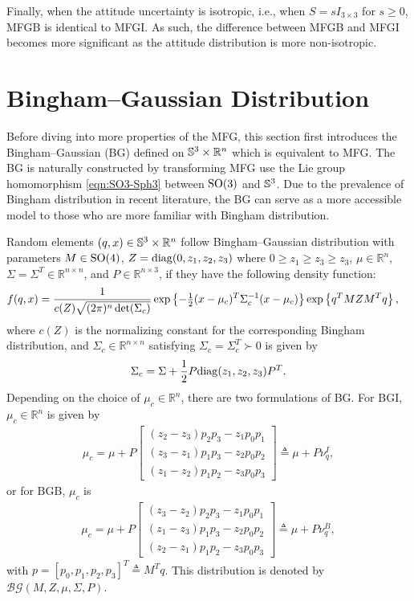 Finally, when the attitude uncertainty is isotropic, i.e., when $S=sI_{3\times 3}$ for $s \geq 0$, MFGB is identical to MFGI.
As such, the difference between MFGB and MFGI becomes more significant as the attitude distribution is more non-isotropic.

\section{Bingham--Gaussian Distribution}

Before diving into more properties of the MFG, this section first introduces the Bingham--Gaussian (BG) defined on $\mathbb{S}^3\times \mathbb{R}^n$ which is equivalent to MFG.
The BG is naturally constructed by transforming MFG use the Lie group homomorphism \eqref{eqn:SO3-Sph3} between $\mathrm{SO}(3)$ and $\mathbb{S}^3$.
Due to the prevalence of Bingham distribution in recent literature, the BG can serve as a more accessible model to those who are more familiar with Bingham distribution.

\begin{definition}
	Random elements $(q,x)\in\mathbb{S}^3\times\mathbb{R}^n$ follow Bingham--Gaussian distribution with parameters $M\in\mathrm{SO}(4)$, $Z = \mathrm{diag}(0,z_1,z_2,z_3)$ where $0\geq z_1 \geq z_3 \geq z_3$, $\mu\in\mathbb{R}^n$, $\Sigma=\Sigma^T\in\mathbb{R}^{n\times n}$, and $P\in\mathbb{R}^{n\times 3}$, if they have the following density function:
	\begin{align} \label{eqn:BG-density}
		&f(q,x) = \frac{1}{c(Z)\sqrt{(2\pi)^n\det(\Sigma_c)}} \exp\left\{  -\tfrac{1}{2}(x-\mu_c)^T \Sigma_c^{-1} (x-\mu_c)  \right\} \exp\left\{ q^TMZM^Tq \right\} ,
	\end{align}
	where $c(Z)$ is the normalizing constant for the corresponding Bingham distribution, and $\Sigma_c\in\mathbb{R}^{n\times n}$ satisfying $\Sigma_c = \Sigma_c^T \succ 0$ is given by
	\begin{align}
		\Sigma_c = \Sigma + \frac{1}{2}P\mathrm{diag}(z_1,z_2,z_3)P^T.
	\end{align}
	Depending on the choice of $\mu_c\in\mathbb{R}^n$, there are two formulations of BG. 
	For BGI, $\mu_c\in\mathbb{R}^n$ is given by
	\begin{align} \label{eqn:BG-vq-BGI}
		\mu_c = \mu + P\begin{bmatrix} (z_2-z_3)p_2p_3 - z_1p_0p_1 \\ (z_3-z_1)p_1p_3 - z_2p_0p_2 \\ (z_1-z_2)p_1p_2 - z_3p_0p_3 \end{bmatrix} \triangleq \mu + P\nu_q^I,
	\end{align}
	or for BGB, $\mu_c$ is
	\begin{align} \label{eqn:BG-vq-BGB}
		\mu_c = \mu + P\begin{bmatrix} (z_3-z_2)p_2p_3 - z_1p_0p_1 \\ (z_1-z_3)p_1p_3 - z_2p_0p_2 \\ (z_2-z_1)p_1p_2 - z_3p_0p_3 \end{bmatrix} \triangleq \mu + P\nu_q^B,
	\end{align}
	with $p = [p_0, p_1, p_2, p_3]^T \triangleq M^Tq$.
	This distribution is denoted by $\mathcal{BG}(M,Z,\mu,\Sigma,P)$.
\end{definition}

